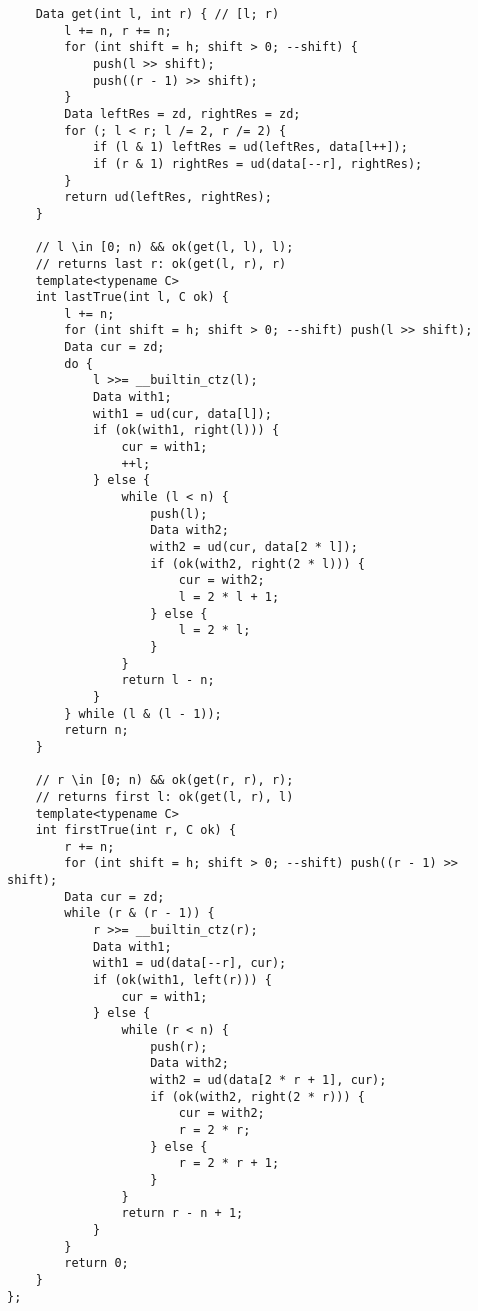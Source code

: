 \begin{lstlisting}
    Data get(int l, int r) { // [l; r)
        l += n, r += n;
        for (int shift = h; shift > 0; --shift) {
            push(l >> shift);
            push((r - 1) >> shift);
        }
        Data leftRes = zd, rightRes = zd;
        for (; l < r; l /= 2, r /= 2) {
            if (l & 1) leftRes = ud(leftRes, data[l++]);
            if (r & 1) rightRes = ud(data[--r], rightRes);
        }
        return ud(leftRes, rightRes);
    }

    // l \in [0; n) && ok(get(l, l), l);
    // returns last r: ok(get(l, r), r)
    template<typename C>
    int lastTrue(int l, C ok) {
        l += n;
        for (int shift = h; shift > 0; --shift) push(l >> shift);
        Data cur = zd;
        do {
            l >>= __builtin_ctz(l);
            Data with1;
            with1 = ud(cur, data[l]);
            if (ok(with1, right(l))) {
                cur = with1;
                ++l;
            } else {
                while (l < n) {
                    push(l);
                    Data with2;
                    with2 = ud(cur, data[2 * l]);
                    if (ok(with2, right(2 * l))) {
                        cur = with2;
                        l = 2 * l + 1;
                    } else {
                        l = 2 * l;
                    }
                }
                return l - n;
            }
        } while (l & (l - 1));
        return n;
    }

    // r \in [0; n) && ok(get(r, r), r);
    // returns first l: ok(get(l, r), l)
    template<typename C>
    int firstTrue(int r, C ok) {
        r += n;
        for (int shift = h; shift > 0; --shift) push((r - 1) >> shift);
        Data cur = zd;
        while (r & (r - 1)) {
            r >>= __builtin_ctz(r);
            Data with1;
            with1 = ud(data[--r], cur);
            if (ok(with1, left(r))) {
                cur = with1;
            } else {
                while (r < n) {
                    push(r);
                    Data with2;
                    with2 = ud(data[2 * r + 1], cur);
                    if (ok(with2, right(2 * r))) {
                        cur = with2;
                        r = 2 * r;
                    } else {
                        r = 2 * r + 1;
                    }
                }
                return r - n + 1;
            }
        }
        return 0;
    }
};
\end{lstlisting}
